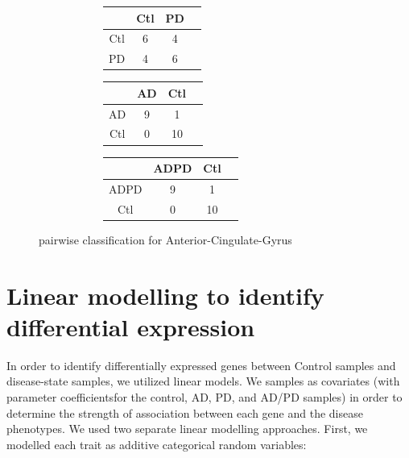 \begin{figure}[H]
\begin{subfigure}{\textwidth}
 \begin{subfigure}[t]{0.3\textwidth}
  \centering
     \makeatletter{}\makeatother
       \begin{tabular}{cccc} 
	  \hline
    & Ctl & PD \\ 
      \hline
    Ctl &   6 &   4 \\ 
      PD &   4 &   6 \\ 
     \hline
	\end{tabular}
  \end{subfigure}
  \begin{subfigure}[t]{0.3\textwidth}
   \centering
        \makeatletter{}\makeatother
         \begin{tabular}{cccc}        
  \hline
 & AD & Ctl \\ 
  \hline
AD &   9 &   1 \\ 
  Ctl &   0 &  10 \\ 
   \hline
     \hline
     \end{tabular}
   \end{subfigure}
   \begin{subfigure}[t]{0.33\textwidth}
   \centering
        \makeatletter{}\makeatother
         \begin{tabular}{cccc}        
  \hline
 & ADPD & Ctl \\ 
  \hline
ADPD &   9 &   1 \\ 
  Ctl &   0 &  10 \\ 
   \hline
	  \end{tabular}
   \end{subfigure}
\end{subfigure}
\caption{\label{fig4ACG} pairwise classification for Anterior-Cingulate-Gyrus}
\end{figure}



\section{Linear modelling to identify differential expression}
\label{sec:line-modell-ident}

In order to identify differentially expressed genes between Control samples and disease-state samples, we utilized linear models. We  samples as covariates (with parameter coefficientsfor the control, AD, PD, and AD/PD samples) in order to determine the strength of association between each gene and the disease phenotypes. We used two separate linear modelling approaches. First, we modelled each trait as additive categorical random variables: 

